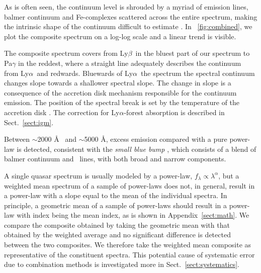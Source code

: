 \documentclass{aa}    %
\newcommand{\figref}[1]{\ref{fig:#1}}
\newcommand{\Fig}[1]{\figurename~\figref{#1}}
\newcommand{\fig}[1]{\Fig{#1}}
\newcommand{\figlabel}[1]{\label{fig:#1}}
\newcommand{\sectionname}{Sect.}
\newcommand{\Sect}[1]{\sectionname~\ref{sect:#1}}
\newcommand{\sect}[1]{\Sect{#1}}
\newcommand{\App}[1]{Appendix~\ref{sect:#1}}
\newcommand{\lya}{Ly$\alpha$}
\newcommand{\lyb}{Ly$\beta$}
\newcommand{\feii}{\ion{Fe}{ii}}
\begin{document}


As is often seen, the continuum level is shrouded by a myriad of emission lines, balmer continuum and Fe-complexes scattered across the entire spectrum, making the intrinsic shape of the continuum difficult to estimate \citep{Elvis2001}. In \fig{combined}, we plot the composite spectrum on a log-log scale and a linear trend is visible. 

The composite spectrum covers from \lyb ~in the bluest part of our spectrum to Pa$\gamma$ in the reddest, where a straight line adequately describes the continuum from \lya~and redwards. Bluewards of \lya~the spectrum the spectral continuum changes slope towards a shallower spectral slope. The change in slope is a consequence of the accretion disk mechanism responsible for the continuum emission. The position of the spectral break is set by the temperature of the accretion disk \citep{Pereyra2006}. The correction for \lya-forest absorption is described in \sect{igm}.


 Between $\sim$2000 \AA~ and $\sim$5000 \AA, excess emission compared with a pure power-law is detected, consistent with  the \textit{small blue bump} \citep{Wills1985}, which consists of a blend of balmer continuum and \feii ~lines, with both broad and narrow components.

 A single quasar spectrum is usually modeled by a power-law, $f_{\lambda} \propto \lambda^\alpha$, but a weighted mean spectrum of a sample of power-laws does not, in general, result in a power-law with a slope equal to the mean of the individual spectra. In principle, a geometric mean of a sample of power-laws should result in a power-law with index being the mean index, as is shown in \App{math}. We compare the composite obtained by taking the geometric mean with that obtained by the weighted average and no significant difference is detected between the two composites. We therefore take the  weighted mean composite as representative of the constituent spectra. This potential cause of systematic error due to combination methods is investigated more in \sect{systematics}.
\end{document}
